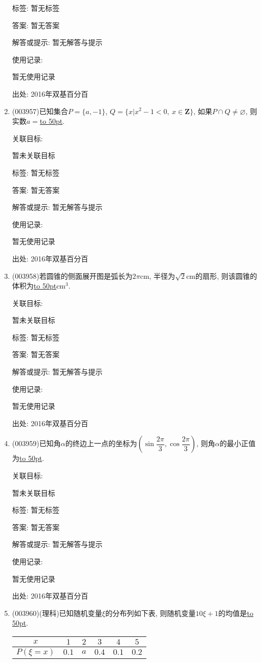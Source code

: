 \documentclass[10pt,a4paper]{article}
\newcommand{\blank}[1]{\underline{\hbox to #1pt{}}}
\begin{document}
\begin{enumerate}[1.]
标签: 暂无标签

答案: 暂无答案

解答或提示: 暂无解答与提示

使用记录:

暂无使用记录


出处: 2016年双基百分百
\item { (003957)}已知集合$P=\{a,-1\}$, $Q=\{x|x^2-1<0, \ x\in \mathbf{Z}\}$, 如果$P\cap Q\ne\varnothing$, 则实数$a=$\blank{50}.


关联目标:

暂未关联目标



标签: 暂无标签

答案: 暂无答案

解答或提示: 暂无解答与提示

使用记录:

暂无使用记录


出处: 2016年双基百分百
\item { (003958)}若圆锥的侧面展开图是弧长为$2\pi$cm, 半径为$\sqrt{2}$cm的扇形, 则该圆锥的体积为\blank{50}cm$^3$.


关联目标:

暂未关联目标



标签: 暂无标签

答案: 暂无答案

解答或提示: 暂无解答与提示

使用记录:

暂无使用记录


出处: 2016年双基百分百
\item { (003959)}已知角$\alpha$的终边上一点的坐标为$\left(\sin\dfrac{2\pi}{3},\cos\dfrac{2\pi}{3}\right)$, 则角$\alpha$的最小正值为\blank{50}.


关联目标:

暂未关联目标



标签: 暂无标签

答案: 暂无答案

解答或提示: 暂无解答与提示

使用记录:

暂无使用记录


出处: 2016年双基百分百
\item { (003960)}(理科)已知随机变量$\xi$的分布列如下表, 则随机变量$10\xi+1$的均值是\blank{50}.
\begin{center}
\begin{tabular}{|c|c|c|c|c|c|}
\hline
$x$ & $1$ & $2$ & $3$ & $4$ & $5$\\ \hline
$P(\xi=x)$ & $0.1$ & $a$ & $0.4$ & $0.1$ & $0.2$\\ \hline
\end{tabular}
\end{center}



\end{enumerate}
\end{document}
